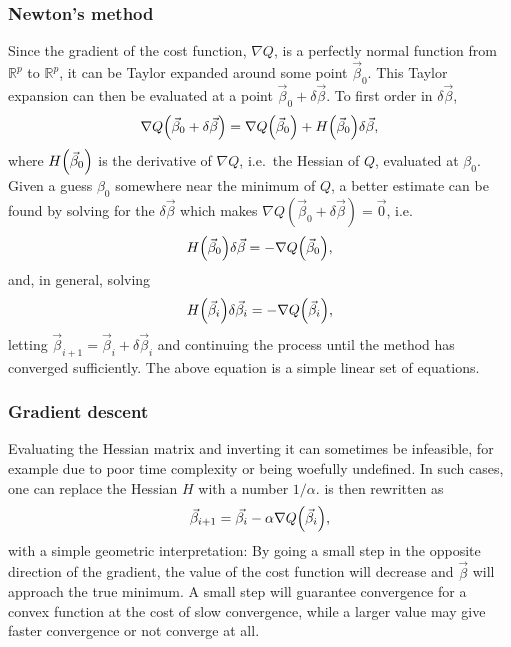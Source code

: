 \documentclass[11pt,british,a4paper]{article}
\numberwithin{equation}{section}
\begin{document}
\subsubsection{Newton's method}\label{subsubsec:newton}
Since the gradient of the cost function, \(\nabla Q\), is a perfectly normal function from \(\mathbb{R}^p\) to \(\mathbb{R}^p\), it can be Taylor expanded around some point \(\vec{\beta}_0\).
This Taylor expansion can then be evaluated at a point \(\vec{\beta}_0 + \delta\vec{\beta}\). To first order in \(\delta\vec{\beta}\),
\begin{equation}
    \nabla Q\qty(\vec{\beta}_0 + \delta\vec{\beta}) = \nabla Q\qty(\vec{\beta}_0) + H\qty(\vec{\beta}_0)\delta\vec{\beta},
\end{equation}
where \(H\qty(\vec{\beta}_0)\) is the derivative of \(\nabla Q\), i.e.\ the Hessian of \(Q\), evaluated at \(\beta_0\).
Given a guess \(\beta_0\) somewhere near the minimum of \(Q\), a better estimate can be found by solving for the \(\delta\vec{\beta}\) which makes \(\nabla Q(\vec{\beta}_0 + \delta\vec{\beta}) = \vec{0}\), i.e.
\begin{equation}
    H\qty(\vec{\beta}_0)\delta\vec{\beta} = -\nabla Q\qty(\vec{\beta}_0),
\end{equation}
and, in general, solving
\begin{equation}
    H\qty(\vec{\beta}_i)\delta\vec{\beta}_i = -\nabla Q\qty(\vec{\beta}_i),\label{eq:newtonstep}
\end{equation}
letting \(\vec{\beta}_{i+1} = \vec{\beta}_i + \delta\vec{\beta}_i\) and continuing the process until the method has converged sufficiently.
The above equation is a simple linear set of equations.


\subsubsection{Gradient descent}
Evaluating the Hessian matrix and inverting it can sometimes be infeasible, for example due to poor time complexity or being woefully undefined.
In such cases, one can replace the Hessian \(H\) with a number \(1/\alpha\).
 is then rewritten as
\begin{equation}
    \vec{\beta}_{i+1} = \vec{\beta_i} - \alpha \nabla Q\qty(\vec{\beta}_i),
\end{equation}
with a simple geometric interpretation:
By going a small step in the opposite direction of the gradient, the value of the cost function will decrease and \(\vec{\beta}\) will approach the true minimum.
A small step will guarantee convergence for a convex function at the cost of slow convergence, while a larger value may give faster convergence or not converge at all.
\end{document}

